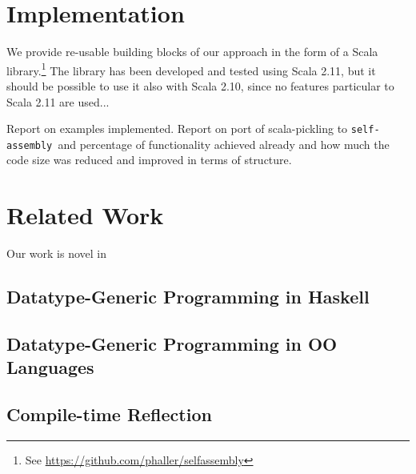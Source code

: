 \documentclass[preprint]{sigplanconf}
\newcommand{\selfassembly}{\texttt{self-assembly~}}
\begin{document}
\section{Implementation}

We provide re-usable building blocks of our approach in the form of a Scala
library.\footnote{See \url{https://github.com/phaller/selfassembly}} The
library has been developed and tested using Scala 2.11, but it should be
possible to use it also with Scala 2.10, since no features particular to
Scala 2.11 are used...

Report on examples implemented. Report on port of scala-pickling to \selfassembly and percentage of functionality
achieved already and how much the code size was reduced and improved in terms of structure.

\section{Related Work}
\label{sec:related-work}

Our work is novel in

\subsection{Datatype-Generic Programming in Haskell}

\subsection{Datatype-Generic Programming in OO Languages}

\subsection{Compile-time Reflection}

\cite{TemplateYourBoilerplate}









% 




\end{document}
